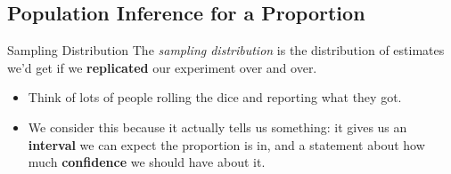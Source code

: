 \subsection{Population Inference for a Proportion}
\begin{df}{Sampling Distribution}
	The \textit{sampling distribution} is the distribution of estimates we'd get if we \textbf{replicated} our experiment over and over. 
\end{df}
\begin{itemize}
	\item Think of lots of people rolling the dice and reporting what they got. 
	\item We consider this because it actually tells us something: it gives us an \textbf{interval} we can expect the proportion is in, and a statement about how much \textbf{confidence} we should have about it. 
\end{itemize}
